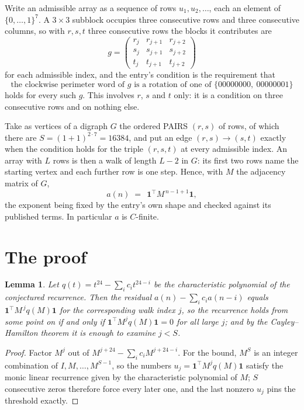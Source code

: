 \documentclass[11pt,a4paper]{article}
\theoremstyle{plain}
\newtheorem{lemma}[theorem]{Lemma}
\theoremstyle{definition}
\begin{document}
Write an admissible array as a sequence of rows $u_1,u_2,\dots$, each an element of
$\{0,\dots,1\}^{7}$. A $3\times3$ subblock occupies three consecutive rows and
three consecutive columns, so with $r,s,t$ three consecutive rows the blocks it
contributes are
\[
g=\begin{pmatrix}r_j&r_{j+1}&r_{j+2}\\ s_j&s_{j+1}&s_{j+2}\\ t_j&t_{j+1}&t_{j+2}\end{pmatrix}
\]
for each admissible index, and the entry's condition is the requirement that
\[
\text{the clockwise perimeter word of }g\text{ is a rotation of one of }\{00000000,\ 00000001\}
\]
holds for every such $g$. This involves $r$, $s$ and $t$ only: it is a condition on
three consecutive rows and on nothing else.

Take as vertices of a digraph $G$ the ordered PAIRS $(r,s)$ of rows, of which there are
$S=(1+1)^{2\cdot7}=16384$, and put an edge $(r,s)\to(s,t)$ exactly when the condition
holds for the triple $(r,s,t)$ at every admissible index. An array with $L$ rows is then a
walk of length $L-2$ in $G$: its first two rows name the starting vertex and each further
row is one step. Hence, with $M$ the adjacency matrix of $G$,
\[
a(n)\;=\;\,\mathbf{1}^{\!\top}M^{\,n-1+1}\mathbf{1},
\]
the exponent being fixed by the entry's own shape and checked against its published terms.
In particular $a$ is $C$-finite.

\section{The proof}

\begin{lemma}\label{lem:crit}
Let $q(t)=t^{24}-\sum_i c_it^{24-i}$ be the characteristic polynomial of the
conjectured recurrence. Then the residual $a(n)-\sum_ic_ia(n-i)$ equals
$\mathbf{1}^{\!\top}M^{\,j}q(M)\mathbf{1}$ for the corresponding walk index
$j$, so the recurrence holds from some point on if and only if
$\mathbf{1}^{\!\top}M^{j}q(M)\mathbf{1}=0$ for all large $j$; and by the
Cayley--Hamilton theorem it is enough to examine $j<S$.
\end{lemma}

\begin{proof}
Factor $M^{j}$ out of $M^{j+24}-\sum_ic_iM^{j+24-i}$. For the bound, $M^{S}$
is an integer combination of $I,M,\dots,M^{S-1}$, so the numbers
$u_j=\mathbf{1}^{\!\top}M^{j}q(M)\mathbf{1}$ satisfy the monic linear recurrence given by
the characteristic polynomial of $M$; $S$ consecutive zeros therefore force every later one,
and the last nonzero $u_j$ pins the threshold exactly.
\end{proof}
\end{document}
